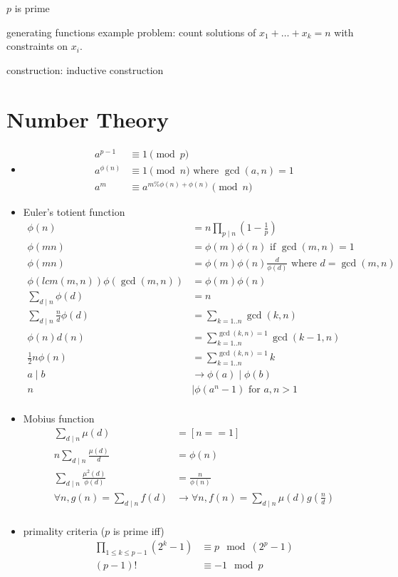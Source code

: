 \documentclass{article}
\begin{document}
$p$ is prime

generating functions %
example problem: count solutions of $x_1 + \hdots + x_k = n$ with constraints on $x_i$. 

construction: inductive construction

\section{Number Theory}
\begin{itemize}

\item
\begin{align*}
	a^{p-1} &\equiv 1 \pmod{p} \\ %
	a^{\phi(n)} &\equiv 1 \pmod{n} \text{ where } \gcd(a,n) = 1 \\ %
	a^m &\equiv a^{m \% \phi(n) + \phi(n)} \pmod{n}
\end{align*}

\item Euler's totient function
\begin{align*}
	\phi(n) &= n \prod_{p \mid n}{(1 - \frac{1}{p})} \\
	\phi(mn) &= \phi(m) \phi(n) \text{ if } \gcd(m, n) = 1 \\
	\phi(mn) &= \phi(m) \phi(n) \frac{d}{\phi(d)} \text{ where } d = \gcd(m, n) \\
	\phi(lcm(m,n)) \phi(\gcd(m,n)) &= \phi(m) \phi(n) \\
	\sum_{d \mid n}{\phi(d)} &= n \\
	\sum_{d \mid n}{\frac{n}{d} \phi(d)} &= \sum_{k=1..n}{\gcd(k, n)} \\
	\phi(n) d(n) &= \sum_{k=1..n}^{\gcd(k,n)=1}{\gcd(k-1, n)} \\
	\frac{1}{2} n \phi(n) &= \sum_{k=1..n}^{\gcd(k,n)=1}{k} \\
	a \mid b &\rightarrow \phi(a) \mid \phi(b) \\
	n &\mid \phi(a^n - 1) \text{ for } a,n > 1 \\
\end{align*}

\item Mobius function
\begin{align*}
	\sum_{d \mid n}{\mu(d)} &= [n==1] \\
	n \sum_{d \mid n}{\frac{\mu(d)}{d}} &= \phi(n) \\
	\sum_{d \mid n}{\frac{\mu^2(d)}{\phi(d)}} &= \frac{n}{\phi(n)} \\
	\forall n, g(n) = \sum_{d \mid n}{f(d)} &\rightarrow \forall n, f(n) = \sum_{d \mid n}{\mu(d) g(\frac{n}{d})} \\ %
\end{align*}

\item primality criteria ($p$ is prime iff)
\begin{align*}
	\prod_{1 \le k \le p-1}{(2^k - 1)} &\equiv p \mod{(2^p - 1)} \\ %
	(p-1)! &\equiv -1 \mod{p} \\ %
\end{align*}

\end{itemize}
\end{document}
